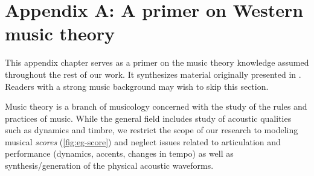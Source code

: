 \chapter{Appendix A: A primer on Western music theory}\label{sec:music-theory-primer}

\ifpdf
    \graphicspath{{Appendix1/Figs/Raster/}{Appendix1/Figs/PDF/}{Appendix1/Figs/}}
\else
    \graphicspath{{Appendix1/Figs/Vector/}{Appendix1/Figs/}}
\fi

This appendix chapter serves as a primer on the music theory knowledge assumed
throughout the rest of our work. It synthesizes material originally presented
in
\citet{franklin2006recurrent,nagler2014schubot,quick2014kulitta,freedman2015correlational}.
Readers with a strong music background may wish to skip this section.

Music theory is a branch of musicology concerned with the study of the rules
and practices of music. While the general field includes study of acoustic
qualities such as dynamics and timbre, we restrict the scope of our research to
modeling musical \emph{scores} (\eg \cref{fig:eg-score}) and neglect issues
related to articulation and performance (\eg dynamics, accents, changes in
tempo) as well as synthesis/generation of the physical acoustic waveforms.

